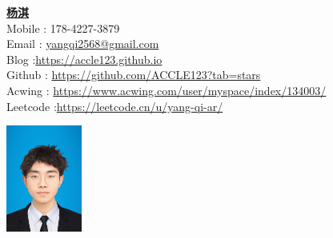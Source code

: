 \documentclass[letterpaper,11pt]{article}
\begin{document}

\noindent
\begin{minipage}{0.8\textwidth}
\textbf{\href{https://accle123.github.io/}{\Large 杨淇 }} \\
  Mobile : 178-4227-3879 \\
  Email : \href{mailto:yangqi2568@gmail.com}{yangqi2568@gmail.com} \\
  Blog :\href{https://accle123.github.io/}{https://accle123.github.io} \\
  Github : \href{https://github.com/ACCLE123?tab=stars}{https://github.com/ACCLE123?tab=stars} \\
  Acwing : \href{https://www.acwing.com/user/myspace/index/134003/}{https://www.acwing.com/user/myspace/index/134003/} \\
  Leetcode :\href{https://leetcode.cn/u/yang-qi-ar/}{https://leetcode.cn/u/yang-qi-ar/} \\
\end{minipage}%
\begin{minipage}{0.2\textwidth}
  \centering
  \includegraphics[width=2.5cm]{yangqi.JPG}
\end{minipage}
\end{document}
